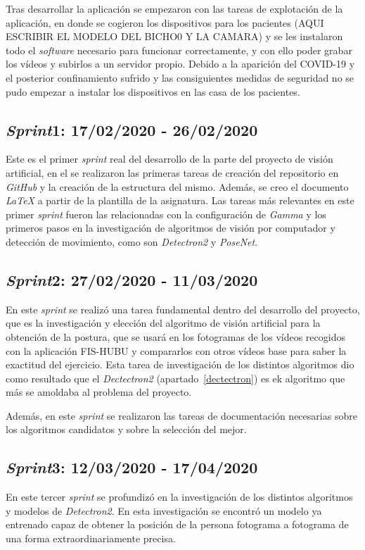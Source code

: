 Tras desarrollar la aplicación se empezaron con las tareas de explotación de la aplicación, en donde se cogieron los dispositivos para los pacientes (AQUI ESCRIBIR EL MODELO DEL BICHO0 Y LA CAMARA) y se les instalaron todo el \textit{software} necesario para funcionar correctamente, y con ello poder grabar los vídeos y subirlos a un servidor propio. Debido a la aparición del COVID-19 y el posterior confinamiento sufrido y las consiguientes medidas de seguridad no se pudo empezar a instalar los dispositivos en las casa de los pacientes.
\subsection{\textit{Sprint}1: 17/02/2020 - 26/02/2020}
Este es el primer \textit{sprint} real del desarrollo de la parte del proyecto de visión artificial, en el se realizaron las primeras tareas de creación del repositorio en \textit{GitHub} y la creación de la estructura del mismo. Además, se creo el documento \textit{LaTeX} a partir de la plantilla de la asignatura. Las tareas más relevantes en este primer \textit{sprint} fueron las relacionadas con la configuración de \textit{Gamma} y los primeros pasos en la investigación de algoritmos de visión por computador y detección de movimiento, como son \textit{Detectron2} y \textit{PoseNet}.
\subsection{\textit{Sprint}2: 27/02/2020 - 11/03/2020}
En este \textit{sprint} se realizó una tarea fundamental dentro del desarrollo del proyecto, que es la investigación y elección del algoritmo de visión artificial para la obtención de la postura, que se usará en los fotogramas de los vídeos recogidos con la aplicación FIS-HUBU y compararlos con otros vídeos base para saber la exactitud del ejercicio. Esta tarea de investigación de los distintos algoritmos dio como resultado que el \textit{Dectectron2} (apartado~\ref{dectectron}) es ek algoritmo que más se amoldaba al problema del proyecto.

Además, en este \textit{sprint} se realizaron las tareas de documentación necesarias sobre los algoritmos candidatos y sobre la selección del mejor.
\subsection{\textit{Sprint}3: 12/03/2020 - 17/04/2020}
En este tercer \textit{sprint} se profundizó en la investigación de los distintos algoritmos y modelos de \textit{Detectron2}. En esta investigación se encontró un modelo ya entrenado capaz de obtener la posición de la persona fotograma a fotograma de una forma extraordinariamente precisa.

